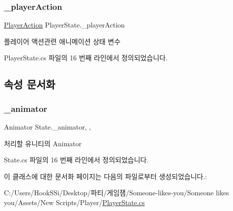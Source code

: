 \mbox{\label{class_player_state_a50343c632d4e11c55e97a58b4c9520ad}} 
\subsubsection{\texorpdfstring{\_playerAction}{\_playerAction}}
{\footnotesize\ttfamily \mbox{\hyperlink{class_player_state_a2909421d9f22a750c1b0eacfc9bafb3d}{Player\+Action}} Player\+State.\+\_\+player\+Action\hspace{0.3cm}{\ttfamily [private]}}



플레이어 액션관련 애니메이션 상태 변수 



Player\+State.\+cs 파일의 16 번째 라인에서 정의되었습니다.



\subsection{속성 문서화}
\mbox{\label{class_state_aff1dd03a1b3c63053b23371d6d70cd1a}} 
\subsubsection{\texorpdfstring{\_animator}{\_animator}}
{\footnotesize\ttfamily Animator State.\+\_\+animator\hspace{0.3cm}{\ttfamily [get]}, {\ttfamily [set]}, {\ttfamily [inherited]}}



처리할 유니티의 Animator 



State.\+cs 파일의 16 번째 라인에서 정의되었습니다.


\begin{DoxyCode}{0}

\end{DoxyCode}


이 클래스에 대한 문서화 페이지는 다음의 파일로부터 생성되었습니다.\+:\begin{DoxyCompactItemize}
\item 
C\+:/\+Users/\+Hook\+S\+Si/\+Desktop/파티/게임잼/\+Someone-\/likes-\/you/\+Someone likes you/\+Assets/\+New Scripts/\+Player/\mbox{\hyperlink{_player_state_8cs}{Player\+State.\+cs}}\end{DoxyCompactItemize}
